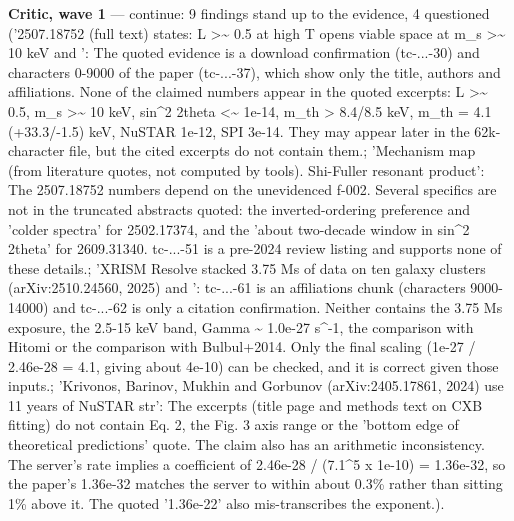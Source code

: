 \documentclass[11pt,a4paper]{article}
\begin{document}
\textbf{Critic, wave 1} --- continue: 9 findings stand up to the evidence, 4 questioned ('2507.18752 (full text) states: L \textgreater{}\textasciitilde{} 0.5 at high T opens viable space at m\_s \textgreater{}\textasciitilde{} 10 keV and ': The quoted evidence is a download confirmation (tc-...-30) and characters 0-9000 of the paper (tc-...-37), which show only the title, authors and affiliations. None of the claimed numbers appear in the quoted excerpts: L \textgreater{}\textasciitilde{} 0.5, m\_s \textgreater{}\textasciitilde{} 10 keV, sin\textasciicircum{}2 2theta \textless{}\textasciitilde{} 1e-14, m\_th \textgreater{} 8.4/8.5 keV, m\_th = 4.1 (+33.3/-1.5) keV, NuSTAR 1e-12, SPI 3e-14. They may appear later in the 62k-character file, but the cited excerpts do not contain them.; 'Mechanism map (from literature quotes, not computed by tools). Shi-Fuller resonant product': The 2507.18752 numbers depend on the unevidenced f-002. Several specifics are not in the truncated abstracts quoted: the inverted-ordering preference and 'colder spectra' for 2502.17374, and the 'about two-decade window in sin\textasciicircum{}2 2theta' for 2609.31340. tc-...-51 is a pre-2024 review listing and supports none of these details.; 'XRISM Resolve stacked 3.75 Ms of data on ten galaxy clusters (arXiv:2510.24560, 2025) and ': tc-...-61 is an affiliations chunk (characters 9000-14000) and tc-...-62 is only a citation confirmation. Neither contains the 3.75 Ms exposure, the 2.5-15 keV band, Gamma \textasciitilde{} 1.0e-27 s\textasciicircum{}-1, the comparison with Hitomi or the comparison with Bulbul+2014. Only the final scaling (1e-27 / 2.46e-28 = 4.1, giving about 4e-10) can be checked, and it is correct given those inputs.; 'Krivonos, Barinov, Mukhin and Gorbunov (arXiv:2405.17861, 2024) use 11 years of NuSTAR str': The excerpts (title page and methods text on CXB fitting) do not contain Eq. 2, the Fig. 3 axis range or the 'bottom edge of theoretical predictions' quote. The claim also has an arithmetic inconsistency. The server's rate implies a coefficient of 2.46e-28 / (7.1\textasciicircum{}5 x 1e-10) = 1.36e-32, so the paper's 1.36e-32 matches the server to within about 0.3\% rather than sitting 1\% above it. The quoted '1.36e-22' also mis-transcribes the exponent.).
\end{document}
